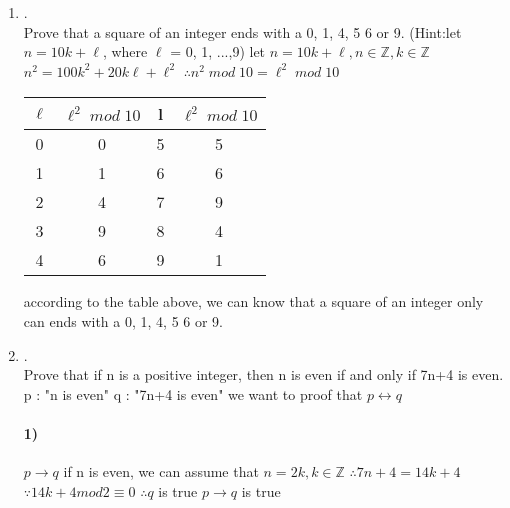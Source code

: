 \documentclass{article}
\theoremstyle{definition}
\theoremstyle{plain}
\begin{document}
\begin {enumerate}[itemindent=30pt,label=\bf Exercise {\arabic*}:]
\paragraph{(a)}
``If $x^{2}$ is irrational, then x is irrational. Therefore, if x is irrational, it follows that $x^{2}$is irrational.``
\subitem if $x = \sqrt{2}, then x^{2} = 2$
\subitem $\because \sqrt{2}$ is irrational, and 2 is rational
\subitem $\therefore$ this statement is not valid.
\paragraph{(b)}
``if $x^{2}$ is irrational, then x is irrational. The number $y = \pi^{2}$ is irrational. Therefore, the number $x = \pi$ is irrational.
\subitem $\forall x \quad x^{2} \in$ irrational number,$x \in$ irrational number
\subitem $\because \pi^{2} \in$ irrational number
\subitem $\therefore \pi \in$ irrational number
\newpage
\item .\\Prove that a square of an integer ends with a 0, 1, 4, 5 6 or 9. (Hint:let $n = 10 k+\ell$, where $\ell$ = 0, 1, ...,9)
\subitem let $n = 10 k + \ell, n \in \mathbb{Z}, k \in \mathbb{Z}$
\subitem $n^{2} = 100 k^{2} + 20 k \ell + \ell^{2}$
\subitem $\therefore n^{2}\;mod\;10 = \ell^{2}\;mod\;10 $
\\
\subitem
\begin{tabular}{| c | c | c | c |}
	\hline
	$\ell$ & $\ell^{2}\;mod\;10$ & l & $\ell^{2}\;mod\;10$ \\
	\hline 
	0 & 0 & 5 & 5 \\
	\hline	
	1 & 1 & 6 & 6 \\
	\hline
	2 & 4 & 7 & 9 \\
	\hline 
	3 & 9 & 8 & 4 \\
	\hline
	4 & 6 & 9 & 1 \\
	\hline	
\end{tabular}
\subitem according to the table above, we can know that a square of an integer only can ends with a 0, 1, 4, 5 6 or 9.
\item.\\
Prove that if n is a positive integer, then n is even if and only if 7n+4 is even.
\subitem p : "n is even" q : "7n+4 is even"
\subitem we want to proof that $p \leftrightarrow q$
\paragraph{1)}
$p \to q$
\subitem if n is even, we can assume that $n = 2k, k \in \mathbb{Z}$
\subitem $\therefore 7n + 4 = 14k + 4$ 
\subitem $\because 14k + 4 mod 2 \equiv 0$
\subitem $\therefore q$ is true
\subitem $p \to q$ is true

\end{enumerate}
\end{document}
